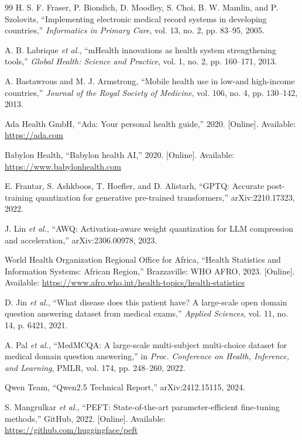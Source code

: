 \documentclass[journal]{IEEEtran}
\begin{document}
\begin{thebibliography}{99}
H. S. F. Fraser, P. Biondich, D. Moodley, S. Choi, B. W. Mamlin, and P. Szolovits,
``Implementing electronic medical record systems in developing countries,''
\textit{Informatics in Primary Care}, vol. 13, no. 2, pp. 83--95, 2005.

A. B. Labrique \textit{et al.},
``mHealth innovations as health system strengthening tools,''
\textit{Global Health: Science and Practice}, vol. 1, no. 2, pp. 160--171, 2013.

A. Bastawrous and M. J. Armstrong,
``Mobile health use in low-and high-income countries,''
\textit{Journal of the Royal Society of Medicine}, vol. 106, no. 4,
pp. 130--142, 2013.

Ada Health GmbH, ``Ada: Your personal health guide,'' 2020.
[Online]. Available: \url{https://ada.com}

Babylon Health, ``Babylon health AI,'' 2020.
[Online]. Available: \url{https://www.babylonhealth.com}

E. Frantar, S. Ashkboos, T. Hoefler, and D. Alistarh,
``GPTQ: Accurate post-training quantization for generative pre-trained transformers,''
arXiv:2210.17323, 2022.

J. Lin \textit{et al.},
``AWQ: Activation-aware weight quantization for LLM compression and acceleration,''
arXiv:2306.00978, 2023.

World Health Organization Regional Office for Africa,
``Health Statistics and Information Systems: African Region,''
Brazzaville: WHO AFRO, 2023.
[Online]. Available: \url{https://www.afro.who.int/health-topics/health-statistics}

D. Jin \textit{et al.},
``What disease does this patient have? A large-scale open domain question answering dataset from medical exams,''
\textit{Applied Sciences}, vol. 11, no. 14, p. 6421, 2021.

A. Pal \textit{et al.},
``MedMCQA: A large-scale multi-subject multi-choice dataset for medical domain question answering,''
in \textit{Proc. Conference on Health, Inference, and Learning},
PMLR, vol. 174, pp. 248--260, 2022.

Qwen Team, ``Qwen2.5 Technical Report,'' arXiv:2412.15115, 2024.

S. Mangrulkar \textit{et al.},
``PEFT: State-of-the-art parameter-efficient fine-tuning methods,''
GitHub, 2022. [Online]. Available: \url{https://github.com/huggingface/peft}


\end{thebibliography}
\end{document}

